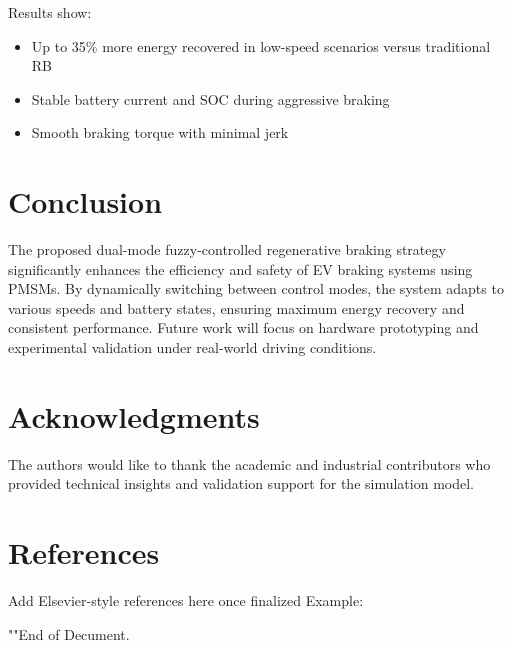 \documentclass{article}
\begin{document}
Results show:
\begin{itemize}
    \item Up to 35\% more energy recovered in low-speed scenarios versus traditional RB
    \item Stable battery current and SOC during aggressive braking
    \item Smooth braking torque with minimal jerk
\end{itemize}

\section{Conclusion}
The proposed dual-mode fuzzy-controlled regenerative braking strategy significantly enhances the efficiency and safety of EV braking systems using PMSMs. By dynamically switching between control modes, the system adapts to various speeds and battery states, ensuring maximum energy recovery and consistent performance. Future work will focus on hardware prototyping and experimental validation under real-world driving conditions.

\section*{Acknowledgments}
The authors would like to thank the academic and industrial contributors who provided technical insights and validation support for the simulation model.

\section*{References}
Add Elsevier-style references here once finalized
Example:


""End of Decument.
\end{document}
